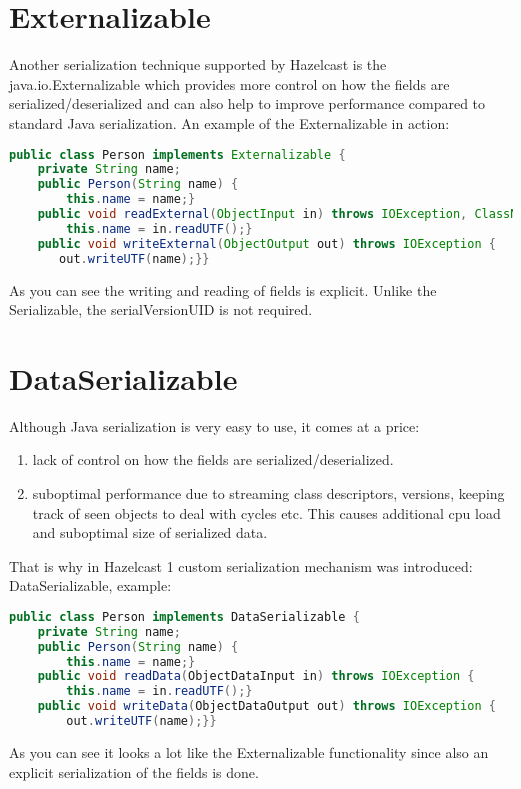 \section{Externalizable}
Another serialization technique supported by Hazelcast is the java.io.Externalizable which provides more control on how the fields are serialized/deserialized and can also help to improve performance compared to standard Java serialization. An example of the Externalizable in action:
\begin{lstlisting}[language=java]
public class Person implements Externalizable {
    private String name;
    public Person(String name) {
        this.name = name;}
    public void readExternal(ObjectInput in) throws IOException, ClassNotFoundException {
        this.name = in.readUTF();}
    public void writeExternal(ObjectOutput out) throws IOException {
       out.writeUTF(name);}}
\end{lstlisting}
As you can see the writing and reading of fields is explicit. Unlike the Serializable, the serialVersionUID is not required.

\section{DataSerializable}
Although Java serialization is very easy to use, it comes at a price:
\begin{enumerate}
\item lack of control on how the fields are serialized/deserialized.
\item suboptimal performance due to streaming class descriptors, versions, keeping track of seen objects to deal with cycles etc. This causes additional cpu load and suboptimal size of serialized data.
\end{enumerate}
That is why in Hazelcast 1 custom serialization mechanism was introduced: DataSerializable, example:
\begin{lstlisting}[language=java]
public class Person implements DataSerializable {
    private String name;
    public Person(String name) {
        this.name = name;}
    public void readData(ObjectDataInput in) throws IOException {
        this.name = in.readUTF();}
    public void writeData(ObjectDataOutput out) throws IOException {
        out.writeUTF(name);}}
\end{lstlisting}
As you can see it looks a lot like the Externalizable functionality since also an explicit serialization of the fields is done. 

